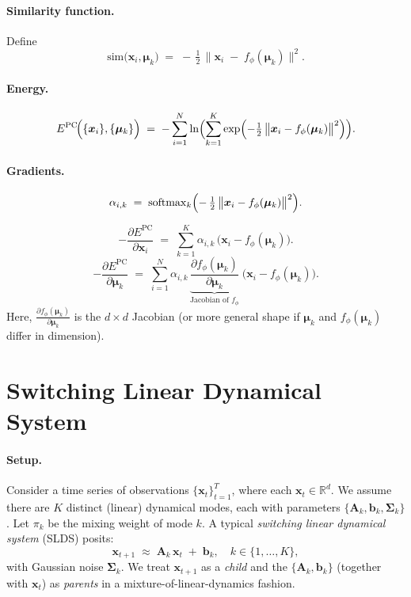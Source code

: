 \documentclass{article}
\begin{document}
\paragraph{Similarity function.}
Define
\[
\mathrm{sim}\bigl(\bm{x}_i,\bm{\mu}_k\bigr)
\;=\;
-\,\tfrac12\,
\bigl\|\bm{x}_i \;-\; f_\phi(\bm{\mu}_k)\bigr\|^2.
\]

\paragraph{Energy.}
\begin{equation}
E^{\mathrm{PC}}\!\Bigl(\{\bm{x}_i\}, \{\bm{\mu}_k\}\Bigr)
\;=\;
-\sum_{i=1}^N
\ln \Bigl(\sum_{k=1}^K
\exp\Bigl(-\tfrac12\,\bigl\|\bm{x}_i - f_\phi(\bm{\mu}_k)\bigr\|^2\Bigr)\Bigr).
\end{equation}

\paragraph{Gradients.}
\[
\alpha_{i,k}
\;=\;
\mathrm{softmax}_k\Bigl(
-\,\tfrac12\,\bigl\|\bm{x}_i - f_\phi(\bm{\mu}_k)\bigr\|^2
\Bigr).
\]

\[
-\frac{\partial E^{\mathrm{PC}}}{\partial \bm{x}_i}
\;=\;
\sum_{k=1}^K 
\alpha_{i,k}\,\bigl(\bm{x}_i - f_\phi(\bm{\mu}_k)\bigr).
\]
\[
-\frac{\partial E^{\mathrm{PC}}}{\partial \bm{\mu}_k}
\;=\;
\sum_{i=1}^N 
\alpha_{i,k}\,
\underbrace{
\frac{\partial f_\phi(\bm{\mu}_k)}{\partial \bm{\mu}_k}
}_{\text{Jacobian of }f_\phi}
\;\bigl(\bm{x}_i - f_\phi(\bm{\mu}_k)\bigr).
\]
Here, \(\tfrac{\partial f_\phi(\bm{\mu}_k)}{\partial \bm{\mu}_k}\) is the \(d\times d\) Jacobian (or more general shape if \(\bm{\mu}_k\) and \(f_\phi(\bm{\mu}_k)\) differ in dimension). 


\section{Switching Linear Dynamical System}

\paragraph{Setup.}
Consider a time series of observations \(\{\bm{x}_t\}_{t=1}^T\), where each \(\bm{x}_t \in \mathbb{R}^d\).  
We assume there are \(K\) distinct (linear) dynamical modes, each with parameters \(\{\bm{A}_k, \bm{b}_k, \bm{\Sigma}_k\}\). Let \(\pi_k\) be the mixing weight of mode \(k\).  A typical \emph{switching linear dynamical system} (SLDS) posits:
\[
\bm{x}_{t+1}
\;\approx\;
\bm{A}_k\,\bm{x}_t \;+\; \bm{b}_k,
\quad
k \in \{1,\dots,K\},
\]
with Gaussian noise \(\bm{\Sigma}_k\).  
We treat \(\bm{x}_{t+1}\) as a \emph{child} and the \(\{\bm{A}_k, \bm{b}_k\}\) (together with \(\bm{x}_t\)) as \emph{parents} in a mixture-of-linear-dynamics fashion.
\end{document}
